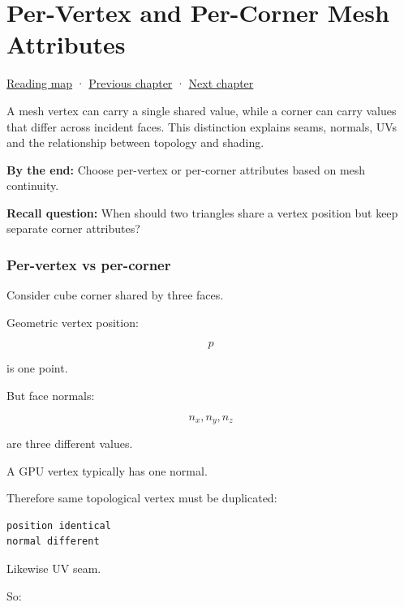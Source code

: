 \chapter{Per-Vertex and Per-Corner Mesh Attributes}\label{04-visual-computing-ii-ch041-per-vertex-and-per-corner-mesh-attributes}\hypertarget{04-visual-computing-ii-ch041}{}\label{stagechapter:04-visual-computing-ii-ch041}

\hypertarget{04-visual-computing-ii-ch041-per-vertex-and-per-corner-mesh-attributes}{}

\hyperref[volume-reading-map]{Reading map} · \hyperref[04-visual-computing-ii-ch030]{Previous chapter} · \hyperref[05-engine-i-ch013]{Next chapter}

A mesh vertex can carry a single shared value, while a corner can carry values that differ across incident faces. This distinction explains seams, normals, UVs and the relationship between topology and shading.

\textbf{By the end:} Choose per-vertex or per-corner attributes based on mesh continuity.

\textbf{Recall question:} When should two triangles share a vertex position but keep separate corner attributes?

\subsection{Per-vertex vs per-corner}\label{04-visual-computing-ii-ch041-per-vertex-vs-per-corner}

\hypertarget{04-visual-computing-ii-ch041-per-vertex-vs-per-corner}{}

Consider cube corner shared by three faces.

Geometric vertex position:

\[
p
\]

is one point.

But face normals:

\[
n_x,n_y,n_z
\]

are three different values.

A GPU vertex typically has one normal.

Therefore same topological vertex must be duplicated:

\begin{verbatim}
position identical
normal different
\end{verbatim}

Likewise UV seam.

So:

